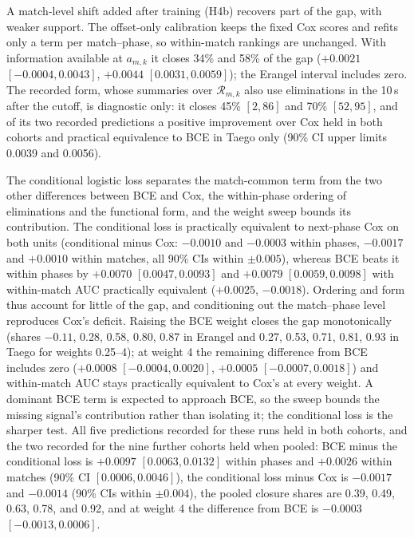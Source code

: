 \documentclass[sigconf,anonymous]{acmart}
\begin{document}
A match-level shift added after training (H4b) recovers part of the gap, with weaker support. The offset-only calibration keeps the fixed Cox scores and refits only a term per match--phase, so within-match rankings are unchanged. With information available at $a_{m,k}$ it closes 34\% and 58\% of the gap ($+0.0021$ $[-0.0004,\allowbreak 0.0043]$, $+0.0044$ $[0.0031,\allowbreak 0.0059]$); the Erangel interval includes zero. The recorded form, whose summaries over $\mathcal{R}_{m,k}$ also use eliminations in the 10\,s after the cutoff, is diagnostic only: it closes 45\% $[2,\allowbreak 86]$ and 70\% $[52,\allowbreak 95]$, and of its two recorded predictions a positive improvement over Cox held in both cohorts and practical equivalence to BCE in Taego only (90\% CI upper limits 0.0039 and 0.0056).

The conditional logistic loss separates the match-common term from the two other differences between BCE and Cox, the within-phase ordering of eliminations and the functional form, and the weight sweep bounds its contribution. The conditional loss is practically equivalent to next-phase Cox on both units (conditional minus Cox: $-0.0010$ and $-0.0003$ within phases, $-0.0017$ and $+0.0010$ within matches, all 90\% CIs within $\pm0.005$), whereas BCE beats it within phases by $+0.0070$ $[0.0047,\allowbreak 0.0093]$ and $+0.0079$ $[0.0059,\allowbreak 0.0098]$ with within-match AUC practically equivalent ($+0.0025$, $-0.0018$). Ordering and form thus account for little of the gap, and conditioning out the match--phase level reproduces Cox's deficit. Raising the BCE weight closes the gap monotonically (shares $-0.11$, 0.28, 0.58, 0.80, 0.87 in Erangel and 0.27, 0.53, 0.71, 0.81, 0.93 in Taego for weights 0.25--4); at weight 4 the remaining difference from BCE includes zero ($+0.0008$ $[-0.0004,\allowbreak 0.0020]$, $+0.0005$ $[-0.0007,\allowbreak 0.0018]$) and within-match AUC stays practically equivalent to Cox's at every weight. A dominant BCE term is expected to approach BCE, so the sweep bounds the missing signal's contribution rather than isolating it; the conditional loss is the sharper test. All five predictions recorded for these runs held in both cohorts, and the two recorded for the nine further cohorts held when pooled: BCE minus the conditional loss is $+0.0097$ $[0.0063,\allowbreak 0.0132]$ within phases and $+0.0026$ within matches (90\% CI $[0.0006,\allowbreak 0.0046]$), the conditional loss minus Cox is $-0.0017$ and $-0.0014$ (90\% CIs within $\pm0.004$), the pooled closure shares are 0.39, 0.49, 0.63, 0.78, and 0.92, and at weight 4 the difference from BCE is $-0.0003$ $[-0.0013,\allowbreak 0.0006]$.
\end{document}
